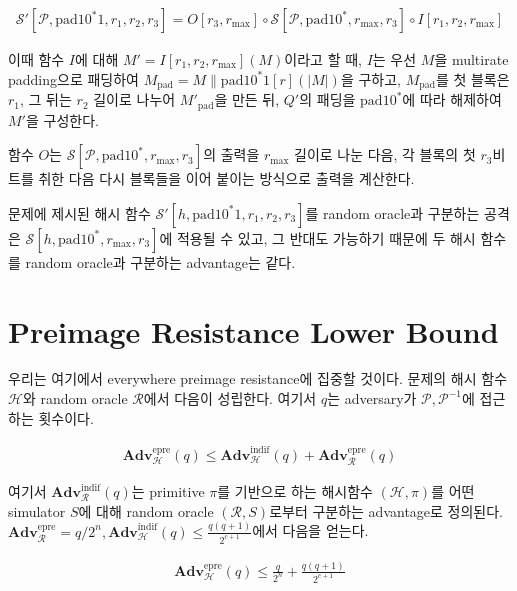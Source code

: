 \documentclass{article}
\newcommand{\adv}{\mathbf{Adv}}
\begin{document}
  \begin{align*}
    \mathcal{S}'[\mathcal{P}, \mathrm{pad10^*1}, r_1, r_2, r_3] = O[r_3, r_\mathrm{max}] \circ \mathcal{S}[\mathcal{P}, \mathrm{pad10^*}, r_\mathrm{max}, r_3] \circ I[r_1, r_2, r_\mathrm{max}]
  \end{align*}

  이때 함수 \(I\)에 대해 \(M' = I[r_1, r_2, r_\mathrm{max}](M)\)이라고 할 때, \(I\)는 우선 \(M\)을 multirate padding으로 패딩하여 \(M_\mathrm{pad} = M \| \mathrm{pad10^*1}[r](|M|)\)을 구하고, \(M_\mathrm{pad}\)를 첫 블록은 \(r_1\), 그 뒤는 \(r_2\) 길이로 나누어 \(M'_\mathrm{pad}\)을 만든 뒤, \(Q'\)의 패딩을 \(\mathrm{pad10^*}\)에 따라 해제하여 \(M'\)을 구성한다.

  함수 \(O\)는 \(\mathcal{S}[\mathcal{P}, \mathrm{pad10^*}, r_\mathrm{max}, r_3]\)의 출력을 \(r_\mathrm{max}\) 길이로 나눈 다음, 각 블록의 첫 \(r_3\)비트를 취한 다음 다시 블록들을 이어 붙이는 방식으로 출력을 계산한다.

  문제에 제시된 해시 함수 \(\mathcal{S}'[h, \mathrm{pad10^*1}, r_1, r_2, r_3]\)를 random oracle과 구분하는 공격은 \(\mathcal{S}[h, \mathrm{pad10^*}, r_\mathrm{max}, r_3]\)에 적용될 수 있고, 그 반대도 가능하기 때문에 두 해시 함수를 random oracle과 구분하는 advantage는 같다.

  \section{Preimage Resistance Lower Bound}
  우리는 여기에서 everywhere preimage resistance에 집중할 것이다.\cite{rogaway_cryptographic_2004} 문제의 해시 함수 \(\mathcal{H}\)와 random oracle \(\mathcal{R}\)에서 다음이 성립한다.\cite{andreeva_security_2011} 여기서 \(q\)는 adversary가 \(\mathcal{P}, \mathcal{P}^{-1}\)에 접근하는 횟수이다.

  \begin{align}\label{epre_adv_bound}
    \adv^\text{epre}_\mathcal{H}(q) \leq \adv^\text{indif}_\mathcal{H}(q) + \adv^\text{epre}_\mathcal{R}(q)
  \end{align}

  여기서 \(\adv^\text{indif}_\mathcal{R}(q)\)는 primitive \(\pi\)를 기반으로 하는 해시함수 \((\mathcal{H}, \pi)\)를 어떤 simulator \(S\)에 대해 random oracle \((\mathcal{R}, S)\)로부터 구분하는 advantage로 정의된다. \(\adv^\text{epre}_\mathcal{R}=q/2^n, \adv^\text{indif}_\mathcal{H}(q)\leq \frac{q(q + 1)}{2^{c + 1}}\)에서 다음을 얻는다.

  \begin{align*}
    \adv^\text{epre}_\mathcal{H}(q) \leq \frac{q}{2^n} + \frac{q(q + 1)}{2^{c + 1}}
  \end{align*}
\end{document}
